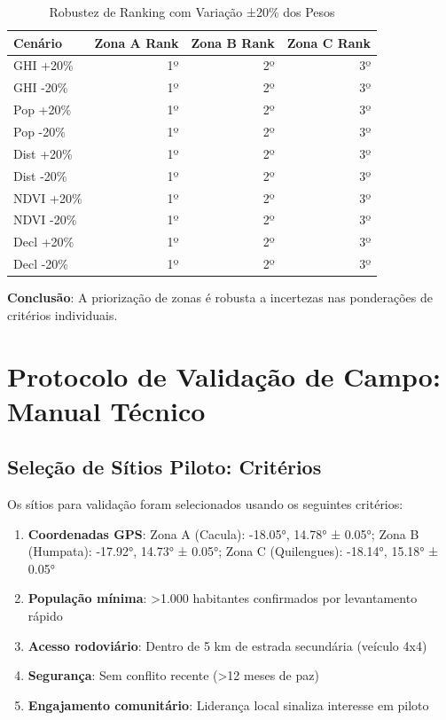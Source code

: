 \documentclass[12pt, a4paper]{article}
\begin{document}
\begin{itemize}
\begin{table}[H]
\centering
\caption{Robustez de Ranking com Variação ±20\% dos Pesos}
\label{tab:ahp_sensitivity}
\small
\begin{tabular}{|l|r|r|r|}
\hline
\textbf{Cenário} & \textbf{Zona A Rank} & \textbf{Zona B Rank} & \textbf{Zona C Rank} \\
\hline
GHI +20\% & 1º & 2º & 3º \\
GHI -20\% & 1º & 2º & 3º \\
Pop +20\% & 1º & 2º & 3º \\
Pop -20\% & 1º & 2º & 3º \\
Dist +20\% & 1º & 2º & 3º \\
Dist -20\% & 1º & 2º & 3º \\
NDVI +20\% & 1º & 2º & 3º \\
NDVI -20\% & 1º & 2º & 3º \\
Decl +20\% & 1º & 2º & 3º \\
Decl -20\% & 1º & 2º & 3º \\
\hline
\end{tabular}
\end{table}

\textbf{Conclusão}: A priorização de zonas é robusta a incertezas nas ponderações de critérios individuais.

\section{Protocolo de Validação de Campo: Manual Técnico}
\label{app:validation_protocol}

\subsection{Seleção de Sítios Piloto: Critérios}

Os sítios para validação foram selecionados usando os seguintes critérios:

\begin{enumerate}
\item \textbf{Coordenadas GPS}: Zona A (Cacula): -18.05°, 14.78° ± 0.05°; Zona B (Humpata): -17.92°, 14.73° ± 0.05°; Zona C (Quilengues): -18.14°, 15.18° ± 0.05°
\item \textbf{População mínima}: >1.000 habitantes confirmados por levantamento rápido
\item \textbf{Acesso rodoviário}: Dentro de 5 km de estrada secundária (veículo 4x4)
\item \textbf{Segurança}: Sem conflito recente (>12 meses de paz)
\item \textbf{Engajamento comunitário}: Liderança local sinaliza interesse em piloto
\end{enumerate}


\end{itemize}
\end{document}
